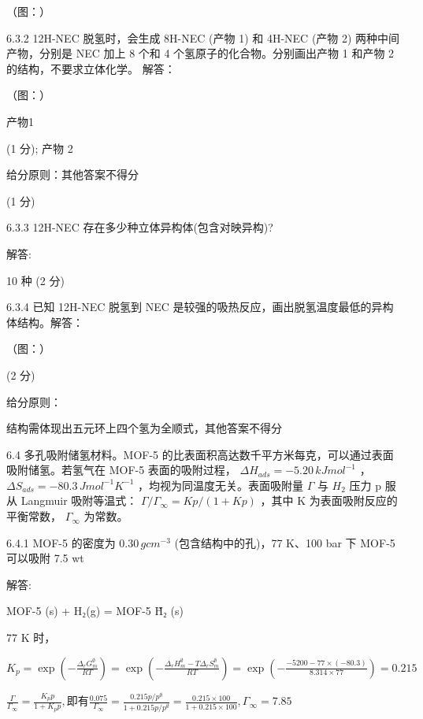 （图：）

6.3.2 12H-NEC 脱氢时，会生成 8H-NEC (产物 1) 和 4H-NEC (产物 2) 两种中间产物，分别是 NEC 加上 8 个和 4 个氢原子的化合物。分别画出产物 1 和产物 2 的结构，不要求立体化学。
解答：

（图：）

产物1

(1 分); 产物 2

给分原则：其他答案不得分

(1 分)

6.3.3 12H-NEC 存在多少种立体异构体(包含对映异构)?

解答:

10 种 (2 分)

6.3.4 已知 12H-NEC 脱氢到 NEC 是较强的吸热反应，画出脱氢温度最低的异构体结构。解答：

（图：）

(2 分)

给分原则：

结构需体现出五元环上四个氢为全顺式，其他答案不得分

6.4 多孔吸附储氢材料。MOF-5 的比表面积高达数千平方米每克，可以通过表面吸附储氢。若氢气在 MOF-5 表面的吸附过程， $\Delta H_{ads} = -5.20 \, kJ mol^{-1}$ ， $\Delta S_{ads} = -80.3 \, J mol^{-1} K^{-1}$ ，均视为同温度无关。表面吸附量 $\Gamma$ 与 $H_{2}$ 压力 p 服从 Langmuir 吸附等温式： $\Gamma/\Gamma_{\infty} = Kp/(1 + Kp)$ ，其中 K 为表面吸附反应的平衡常数， $\Gamma_{\infty}$ 为常数。

6.4.1 MOF-5 的密度为 $0.30 \, g cm^{-3}$ (包含结构中的孔)，77 K、100 bar 下 MOF-5 可以吸附 7.5 wt%

解答:

MOF-5 (s) + H₂(g) = MOF-5 \~ H₂ (s)

77 K 时，

$
K _ {p} = \exp \left(- \frac {\varDelta_ {r} G _ {m} ^ {\emptyset}}{R T}\right) = \exp \left(- \frac {\varDelta_ {r} H _ {m} ^ {\emptyset} - T \varDelta_ {r} S _ {m} ^ {\emptyset}}{R T}\right) = \exp \left(- \frac {- 5 2 0 0 - 7 7 \times (- 8 0 . 3)}{8 . 3 1 4 \times 7 7}\right) = 0. 2 1 5\tag{2 分}
$

$
\frac {\Gamma}{\Gamma_ {\infty}} = \frac {K _ {p} p}{1 + K _ {p} p}, \text {即有} \frac {0 . 0 7 5}{\Gamma_ {\infty}} = \frac {0 . 2 1 5 p / p ^ {\emptyset}}{1 + 0 . 2 1 5 p / p ^ {\emptyset}} = \frac {0 . 2 1 5 \times 1 0 0}{1 + 0 . 2 1 5 \times 1 0 0}, \Gamma_ {\infty} = 7.85\tag{2 分}
$

